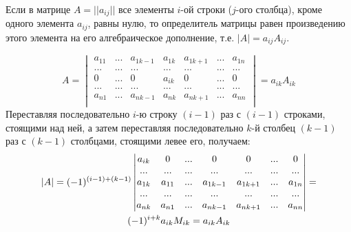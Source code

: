\documentclass[a4paper,14pt]{article}
\begin{document}
\begin{lemma}
	Если в матрице $A=||a_{ij}||$ все элементы $i$-ой строки ($j$-ого столбца), кроме одного элемента $a_{ij}$, равны нулю, то определитель матрицы равен произведению этого элемента на его алгебраическое дополнение, т.е. $|A|=a_{ij}A_{ij}$.
	\begin{evidence}
		\[
		A=
		\begin{vmatrix}
		a_{11} & ... & a_{1k-1} & a_{1k} & a_{1k+1} & ... & a_{1n} \\
		... & ... & ... & ... & ... & ... & ... \\
		0 & ... & 0 & a_{ik} & 0 & ... & 0 \\
		... & ... & ... & ... & ... & ... & ... \\
		a_{n1} & ... & a_{nk-1} & a_{nk} & a_{nk+1} & ... & a_{nn} \\
		\end{vmatrix} = a_{ik}A_{ik}
		\]
		Переставляя последовательно $i$-ю строку $(i-1)$ раз с $(i-1)$ строками, стоящими над ней, а затем переставляя последовательно $k$-й столбец $(k-1)$ раз с $(k-1)$ столбцами, стоящими левее его, получаем:
		\begin{multline}
		|A|=(-1)^{(i-1)+(k-1)}
		\begin{vmatrix}
		a_{ik} & 0 & ... & 0 & 0 & ... & 0 \\
		... & ... & ... & ... & ... & ... & ... \\
		a_{1k} & a_{11} & ... & a_{1k-1} & a_{1k+1} & ... & a_{1n} \\
		... & ... & ... & ... & ... & ... & ... \\
		a_{nk} & a_{n1} & ... & a_{nk-1} & a_{nk+1} & ... & a_{nn} \\
		\end{vmatrix} \hm{=} \\ (-1)^{i+k}a_{ik}M_{ik} = a_{ik}A_{ik}
		\end{multline}
	\end{evidence}
\end{lemma}
\end{document}
